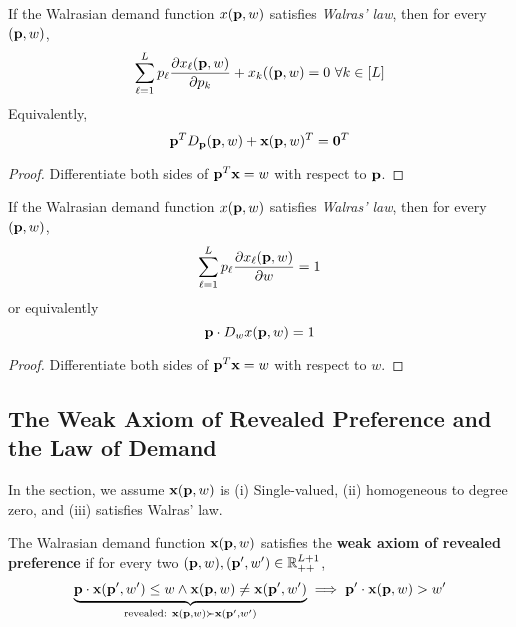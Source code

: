 \documentclass{article}
\begin{document}
 			\begin{proposition}
 				If the Walrasian demand function $x(\textbf{p}, w)$ satisfies \emph{Walras' law}, then for every $(\textbf{p}, w)$,
 				\begin{equation}
 					\sum_{\ell=1}^L p_\ell \frac{\partial{x_\ell(\textbf{p}, w)}}{\partial{p_k}} + x_k((\textbf{p}, w) = 0\ \forall k \in [L]
 				\end{equation}
 				Equivalently,
 				\begin{equation}
 					\textbf{p}^T D_{\textbf{p}} (\textbf{p}, w) + \textbf{x}(\textbf{p}, w)^T = \textbf{0}^T
 				\end{equation}
 				\begin{proof}
 					Differentiate both sides of $\textbf{p}^T \textbf{x} = w$ with respect to $\textbf{p}$.
 				\end{proof}
 			\end{proposition}
 			
 			\begin{proposition}
 				If the Walrasian demand function $x(\textbf{p}, w)$ satisfies \emph{Walras' law}, then for every $(\textbf{p}, w)$,
 				\begin{equation}
 					\sum_{\ell=1}^L p_\ell \frac{\partial{x_\ell(\textbf{p}, w)}}{\partial{w}} = 1
 				\end{equation}
 				or equivalently
 				\begin{equation}
 					\textbf{p} \cdot D_{w} x(\textbf{p}, w) = 1
 				\end{equation}
 				\begin{proof}
 					Differentiate both sides of $\textbf{p}^T \textbf{x} = w$ with respect to $w$.
 				\end{proof}
 			\end{proposition}
 		
 		\subsection{The Weak Axiom of Revealed Preference and the Law of Demand}
 			\begin{assumption}
 				In the section, we assume $\textbf{x}(\textbf{p}, w)$ is (i) Single-valued, (ii) homogeneous to degree zero, and (iii) satisfies Walras' law.
 			\end{assumption}
 			
 			\begin{definition}
 				The Walrasian demand function $\textbf{x}(\textbf{p}, w)$ satisfies the \textbf{weak axiom of revealed preference} if for every two $(\textbf{p}, w), (\textbf{p}', w') \in \mathbb{R}_{++}^{L+1}$,
 				\begin{gather}
 					\underbrace{\textbf{p} \cdot \textbf{x}(\textbf{p}', w') \leq w
 					\land \textbf{x}(\textbf{p}, w) \neq \textbf{x}(\textbf{p}', w')}_{\text{{revealed: }} \textbf{x}(\textbf{p}, w) \succ \textbf{x}(\textbf{p}', w')}
 					\implies \textbf{p}' \cdot \textbf{x}(\textbf{p}, w) > w'
 				\end{gather}
 			\end{definition}
 			
\end{document}
